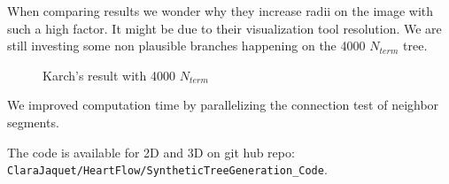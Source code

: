 \documentclass[a4paper, 11pt]{article} %
\begin{document}
When comparing results we wonder why they increase radii on the image with such a high factor. It might be due to their visualization tool resolution. We are still investing some non plausible branches happening on the 4000 $N_{term}$ tree.
\begin{figure}[!h]
\centering
{}
\caption{Karch's result with 4000 $N_{term}$ \cite{schreiner1993computer}}
\end{figure}

We improved computation time by parallelizing the connection test of neighbor segments.

The code is available for 2D and 3D on git hub repo: \verb|ClaraJaquet/HeartFlow/SyntheticTreeGeneration_Code|.
\end{document}
